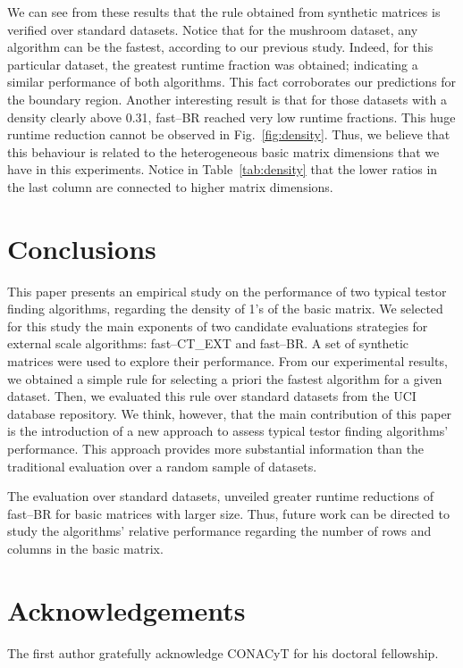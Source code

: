 \documentclass[citenumber]{llncs}
\begin{document}
	We can see from these results that the rule obtained from synthetic matrices is verified over standard datasets. Notice that for the mushroom dataset, any algorithm can be the fastest, according to our previous study. Indeed, for this particular dataset, the greatest runtime fraction was obtained; indicating a similar performance of both algorithms. This fact corroborates our predictions for the boundary region. Another interesting result is that for those datasets with a density clearly above 0.31, fast--BR reached very low runtime fractions. This huge runtime reduction cannot be observed in Fig.~\ref{fig:density}. Thus, we believe that this behaviour is related to the heterogeneous basic matrix dimensions that we have in this experiments. Notice in Table~\ref{tab:density} that the lower ratios in the last column are connected to higher matrix dimensions.
 
%
\section{Conclusions} \label{conclusions}
%
 This paper presents an empirical study on the performance of two typical testor finding algorithms, regarding the density of 1's of the basic matrix. We selected for this study the main exponents of two candidate evaluations strategies for external scale algorithms: fast--CT\_EXT and fast--BR. A set of synthetic matrices were used to explore their performance. From our experimental results, we obtained a simple rule for selecting a priori the fastest algorithm for a given dataset. Then, we evaluated this rule over standard datasets from the UCI database repository. We think, however, that the main contribution of this paper is the introduction of a new approach to assess typical testor finding algorithms' performance. This approach provides more substantial information than the traditional evaluation over a random sample of datasets.
 
 The evaluation over standard datasets, unveiled greater runtime reductions of fast--BR for basic matrices with larger size. Thus, future work can be directed to study the algorithms' relative performance regarding the number of rows and columns in the basic matrix.
 
%
\section{Acknowledgements} \label{Acknowledgements}
%
	The first author gratefully acknowledge CONACyT for his doctoral fellowship.
\end{document}
